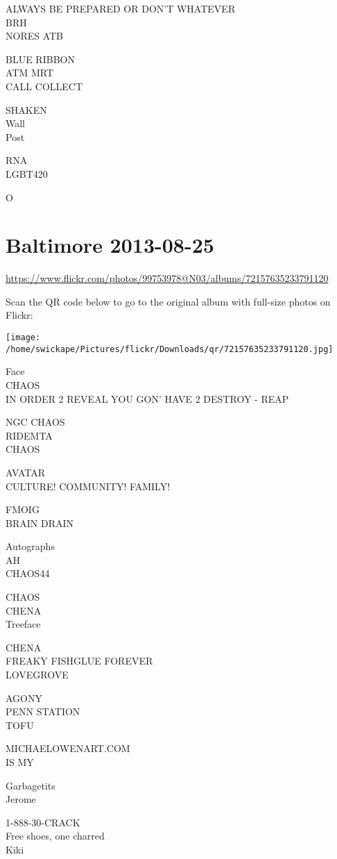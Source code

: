\documentclass[10pt,letterpaper]{article}
\begin{document}
ALWAYS BE PREPARED OR DON'T WHATEVER\\
BRH\\
NORES ATB

BLUE RIBBON\\
ATM MRT\\
CALL COLLECT

SHAKEN\\
Wall\\
Post

RNA\\
LGBT420

O


\section*{Baltimore 2013-08-25}

\url{https://www.flickr.com/photos/99753978@N03/albums/72157635233791120}

Scan the QR code below to go to the original album with full-size photos on Flickr:

\texttt{[image: /home/swickape/Pictures/flickr/Downloads/qr/72157635233791120.jpg]}


Face\\
CHAOS\\
IN ORDER 2 REVEAL YOU GON' HAVE 2 DESTROY {-} REAP

NGC CHAOS\\
RIDEMTA\\
CHAOS

AVATAR\\
CULTURE! COMMUNITY! FAMILY!

FMOIG\\
BRAIN DRAIN

Autographs\\
AH\\
CHAOS44

CHAOS\\
CHENA\\
Treeface

CHENA\\
FREAKY FISHGLUE FOREVER\\
LOVEGROVE

AGONY\\
PENN STATION\\
TOFU

MICHAELOWENART.COM\\
IS MY

Garbagetits\\
Jerome

1{-}888{-}30{-}CRACK\\
Free shoes, one charred\\
Kiki
\end{document}
